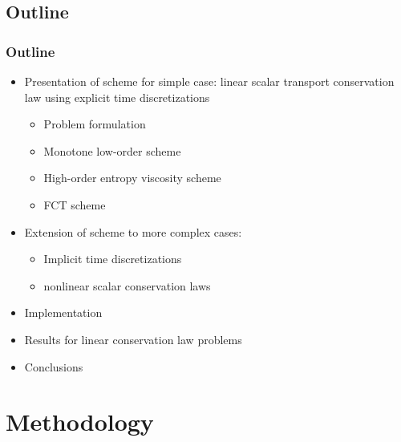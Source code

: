 \documentclass{beamer}
\begin{document}
\subsection{Outline}
\begin{frame}
\frametitle{Outline}

\begin{itemize}
   \item Presentation of scheme for simple case: linear scalar transport
      conservation law using explicit time discretizations
   \begin{itemize}
      \item Problem formulation
      \item Monotone low-order scheme
      \item High-order entropy viscosity scheme
      \item FCT scheme
   \end{itemize}
   \item Extension of scheme to more complex cases:
   \begin{itemize}
      \item Implicit time discretizations
      \item nonlinear scalar conservation laws
   \end{itemize}
   \item Implementation
   \item Results for linear conservation law problems
   \item Conclusions
\end{itemize}

\end{frame}
\section{Methodology}
\end{document}
